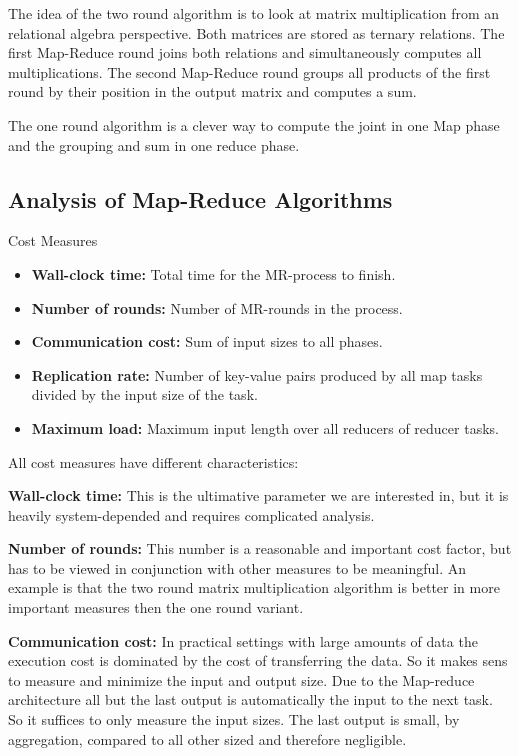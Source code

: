 \documentclass[english]{panikzettel}
\begin{document}
The idea of the two round algorithm is to look at matrix multiplication from an relational algebra perspective. Both matrices are stored as ternary relations.
The first Map-Reduce round joins both relations and simultaneously computes all multiplications.
The second Map-Reduce round groups all products of the first round by their position in the output matrix and computes a sum.

The one round algorithm is a clever way to compute the joint in one Map phase and the grouping and sum in one reduce phase.

\subsection{Analysis of Map-Reduce Algorithms}
\begin{defi}{Cost Measures}
\begin{itemize}[leftmargin=*]
	\item \textbf{Wall-clock time:} Total time for the MR-process to finish.
	\item \textbf{Number of rounds:} Number of MR-rounds in the process.
	\item \textbf{Communication cost:} Sum of input sizes to all phases.
	\item \textbf{Replication rate:} Number of key-value pairs produced by all map tasks divided by the input size of the task.
	\item \textbf{Maximum load:} Maximum input length over all reducers of reducer tasks.
\end{itemize}
\end{defi}

All cost measures have different characteristics:

\textbf{Wall-clock time:} This is the ultimative parameter we are interested in, but it is heavily system-depended and requires complicated analysis.

\textbf{Number of rounds:} This number is a reasonable and important cost factor, but has to be viewed in conjunction with other measures to be meaningful. An example is that the two round matrix multiplication algorithm is better in more important measures then the one round variant.

\textbf{Communication cost:} In practical settings with large amounts of data the execution cost is dominated by the cost of transferring the data. So it makes sens to measure and minimize the input and output size.
Due to the Map-reduce architecture all but the last output is automatically the input to the next task. So it suffices to only measure the input sizes. The last output is small, by aggregation, compared to all other sized and therefore negligible.
\end{document}
